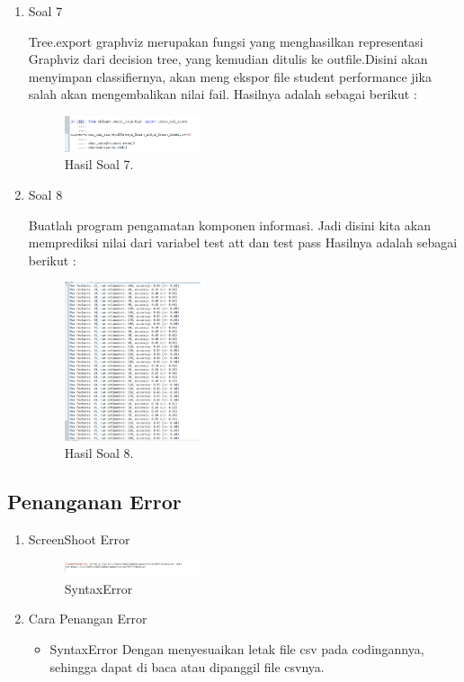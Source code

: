 \begin{enumerate}
	\item Soal 7
	\hfill\break
	
	Tree.export graphviz merupakan fungsi yang menghasilkan representasi Graphviz dari decision tree, yang kemudian ditulis ke outfile.Disini akan menyimpan classifiernya, akan meng ekspor file student performance jika salah akan mengembalikan nilai fail. Hasilnya adalah sebagai berikut :
	\begin{figure}[H]
	\centering
		\includegraphics[width=4cm]{figures/1174077/4/materi/hasil7.PNG}
		\caption{Hasil Soal 7.}
	\end{figure}

	\item Soal 8
	\hfill\break
	
	Buatlah program pengamatan komponen informasi. Jadi disini kita akan memprediksi nilai dari variabel test att dan test pass Hasilnya adalah sebagai berikut :
	\begin{figure}[H]
	\centering
		\includegraphics[width=4cm]{figures/1174077/4/materi/hasil8.PNG}
		\caption{Hasil Soal 8.}
	\end{figure}
\end{enumerate}

\subsection{Penanganan Error}
\begin{enumerate}
	\item ScreenShoot Error
	\begin{figure}[H]
		\includegraphics[width=4cm]{figures/1174077/4/error/1.PNG}
		\centering
		\caption{SyntaxError}
	\end{figure}
	\item Cara Penangan Error
	\begin{itemize}
		\item SyntaxError
		\hfill\break
		Dengan menyesuaikan letak file csv pada codingannya, sehingga dapat  di baca atau dipanggil file csvnya.
	\end{itemize}
\end{enumerate}

